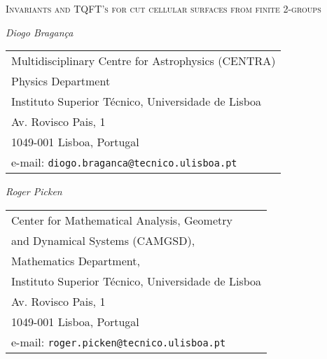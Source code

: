 \documentclass[a4paper,11pt]{article}
\begin{document}
\thispagestyle{plain}



\begin{center}

\Large

\textsc{Invariants and TQFT's for cut cellular surfaces from finite 2-groups}

\end{center}



\begin{center}

\textit{Diogo Bragan\c ca}  \smallskip \\

\begin{tabular}{l}
\small Multidisciplinary Centre for Astrophysics (CENTRA) \\
\small  Physics Department \\
\small Instituto Superior T\'ecnico, Universidade de Lisboa  \\
\small Av. Rovisco Pais, 1                    \\
\small 1049-001 Lisboa, Portugal       \\
\small e-mail: \texttt{diogo.braganca@tecnico.ulisboa.pt}   \\ 
\end{tabular}

\end{center}



\begin{center}

\textit{Roger Picken} \smallskip \\

\begin{tabular}{l}
\small Center for Mathematical Analysis, Geometry \\ 
\small and Dynamical Systems (CAMGSD), \\ 
\small Mathematics Department, \\
\small  Instituto Superior T\'ecnico, Universidade de Lisboa \\
\small Av. Rovisco Pais, 1 \\
\small 1049-001 Lisboa, Portugal \\
\small e-mail: \texttt{roger.picken@tecnico.ulisboa.pt}
\end{tabular}



\end{center}
\end{document}
